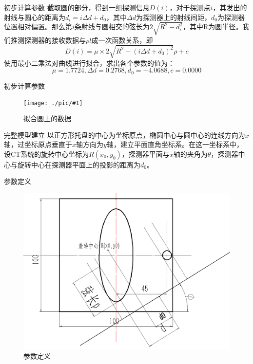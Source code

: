 \documentclass{beamer}
\newcommand{\maxpic}[2]{  \begin{figure}[H]
\centering
\texttt{[image: ./pic/\#1]}\\
\caption{#2}
\end{figure}}
\begin{document}
\begin{frame}{初步计算参数}
	截取圆的部分，得到一组探测信息\(D(i)\)，对于探测点\(i\)，其发出的射线与圆心的距离为\(d_i = i\Delta d + d_0\)，其中\(\Delta d\)为探测器上的射线间距，\(d_0\)为探测器位置相对偏置。那么第\(i\)条射线与圆相交的弦长为\(2\sqrt{R^2 - d_i^2}\)，其中R为圆半径。我们推测探测器的接收数据与\(\rho l\)成一次函数关系，即
	\begin{equation}
		D(i)  = \mu\times 2\sqrt{R^2 - ( i\Delta d + d_0)^2}\rho  +c
	\end{equation}
	使用最小二乘法对曲线进行拟合，求出各个参数的值为：
	\[\mu =1.7724 , \Delta d = 0.2768, d_0 = -4.0688, c = 0.0000\]
\end{frame}

\begin{frame}{初步计算参数}
	\maxpic{fitCir.png}{拟合圆上的数据}
\end{frame}

\begin{frame}{完整模型建立}
	以正方形托盘的中心为坐标原点，椭圆中心与圆中心的连线方向为\(x\)轴，过坐标原点垂直于\(x\)轴方向为\(y\)轴，建立平面直角坐标系。在这一坐标系中，设CT系统的旋转中心坐标为\(R(x_0,y_0)\)，探测器平面与\(x\)轴的夹角为\(\theta\)，探测器中心与旋转中心在探测器平面上的投影的距离为\(d_0\)。
	  
\end{frame}

\begin{frame}{参数定义}
	\begin{figure}
		\begin{center}
			\includegraphics[scale=0.3]{pic/q13.png}
		\end{center}
		\caption{参数定义}
		\label{Fig:xian}
	\end{figure}
\end{frame}
\end{document}
